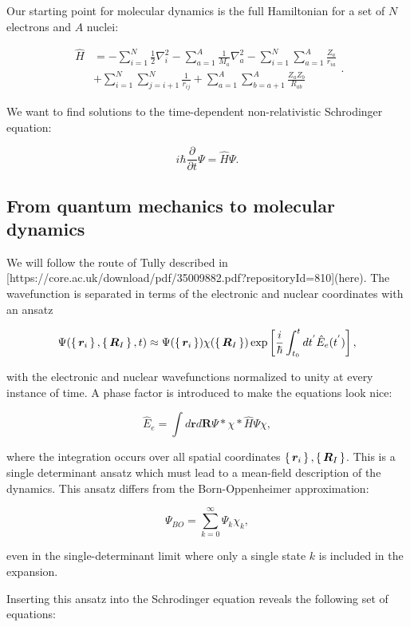 Our starting point for molecular dynamics is
the full Hamiltonian for a set of $N$ electrons and $A$ nuclei:

\begin{equation}
    \begin{split}
        \hat{H} 
        &= -\sum_{i=1}^N \frac{1}{2} \nabla_i^2
        -\sum_{a=1}^A \frac{1}{M_a} \nabla_a^2
        -\sum_{i=1}^N \sum_{a=1}^A \frac{Z_a}{r_{ia}} \\
        &+ \sum_{i=1}^N \sum_{j=i+1}^N \frac{1}{r_{ij}}
        + \sum_{a=1}^A \sum_{b=a+1}^A \frac{Z_a Z_b}{R_{ab}}
    \end{split} .
\end{equation}

We want to find solutions to the time-dependent non-relativistic
Schrodinger equation:

$$ i\hbar \frac{\partial}{\partial t} \Psi = \hat{H} \Psi . $$

\subsection{From quantum mechanics to molecular dynamics}

We will follow the route of Tully described in
[https://core.ac.uk/download/pdf/35009882.pdf?repositoryId=810](here).
The wavefunction is separated in terms of the electronic and nuclear
coordinates with an ansatz

$$ \Psi(\set{\bm{r}_i}, \set{\bm{R}_I}, t)
    \approx \Psi(\set{\bm{r}_i}) \chi(\set{\bm{R}_I})
    \exp \left[ \frac{i}{\hbar} \int_{t_0}^t
    dt^{'} \hat{E}_e(t^{'}) \right] ,
$$

with the electronic and nuclear wavefunctions normalized to unity
at every instance of time. A phase factor is introduced to make
the equations look nice:

$$ \hat{E}_e = \int d\bm{r} d\bm{R} \Psi* \chi* \hat{H} \Psi \chi , $$

where the integration occurs over all spatial coordinates
$\set{\bm{r}_i}, \set{\bm{R}_I}$. This is a single determinant
ansatz which must lead to a mean-field description of the dynamics.
This ansatz differs from the Born-Oppenheimer approximation:

$$ \Psi_{BO} = \sum_{k=0}^{\infty} \Psi_k \chi_k , $$

even in the single-determinant limit where only
a single state $k$ is included in the expansion.
\par
Inserting this ansatz into the Schrodinger equation
reveals the following set of equations:

